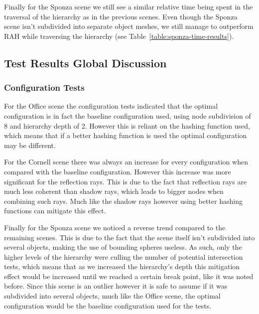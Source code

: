 Finally for the Sponza scene we still see a similar relative time being spent in the traversal of the hierarchy as in the previous scenes. Even though the Sponza scene isn't subdivided into separate object meshes, we still manage to outperform RAH while traversing the hierarchy (see Table~\ref{table:sponza-time-results}). 

\vfill

\pagebreak


\subsection{Test Results Global Discussion}

\subsubsection{Configuration Tests}

For the Office scene the configuration tests indicated that the optimal configuration is in fact the baseline configuration used, using node subdivision of 8 and hierarchy depth of 2. However this is reliant on the hashing function used, which means that if a better hashing function is used the optimal configuration may be different. 

\medskip

For the Cornell scene there was always an increase for every configuration when compared with the baseline configuration. However this increase was more significant for the reflection rays. This is due to the fact that reflection rays are much less coherent than shadow rays, which leads to bigger nodes when combining such rays. Much like the shadow rays however using better hashing functions can mitigate this effect.

\medskip

Finally for the Sponza scene we noticed a reverse trend compared to the remaining scenes. This is due to the fact that the scene itself isn't subdivided into several objects, making the use of bounding spheres useless. As such, only the higher levels of the hierarchy were culling the number of potential intersection tests, which means that as we increased the hierarchy's depth this mitigation effect would be increased until we reached a certain break point, like it was noted before. Since this scene is an outlier however it is safe to assume if it was subdivided into several objects, much like the Office scene, the optimal configuration would be the baseline configuration used for the tests.

